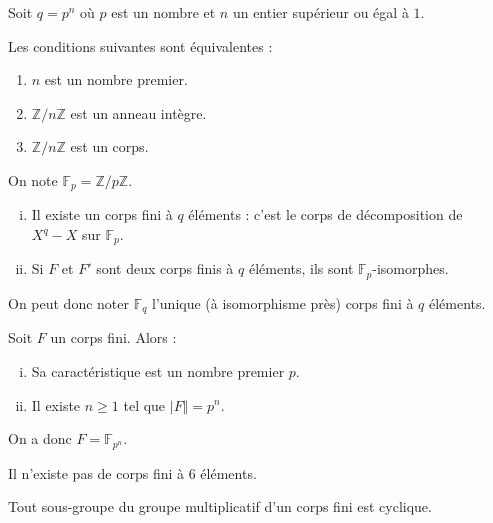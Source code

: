 	Soit $q = p^n$ où $p$ est un nombre et $n$ un entier supérieur ou égal à $1$.
	
	
	\begin{proposition}
		Les conditions suivantes sont équivalentes :
		\begin{enumerate}
			\item $n$ est un nombre premier.
			\item $\mathbb{Z}/n\mathbb{Z}$ est un anneau intègre.
			\item $\mathbb{Z}/n\mathbb{Z}$ est un corps.
		\end{enumerate}
	\end{proposition}
	
	\begin{notation}
		On note $\mathbb{F}_p = \mathbb{Z}/p\mathbb{Z}$.
	\end{notation}
	
	
	\begin{theorem}
		\begin{enumerate}[(i)]
			\item Il existe un corps fini à $q$ éléments : c'est le corps de décomposition de $X^q - X$ sur $\mathbb{F}_p$.
			\item Si $F$ et $F'$ sont deux corps finis à $q$ éléments, ils sont $\mathbb{F}_p$-isomorphes.
		\end{enumerate}
		On peut donc noter $\mathbb{F}_q$ l'unique (à isomorphisme près) corps fini à $q$ éléments.
	\end{theorem}
	
	
	\begin{theorem}
		Soit $F$ un corps fini. Alors :
		\begin{enumerate}[(i)]
			\item Sa caractéristique est un nombre premier $p$.
			\item Il existe $n \geq 1$ tel que $\vert F \Vert = p^n$.
		\end{enumerate}
		On a donc $F = \mathbb{F}_{p^n}$.
	\end{theorem}
	
	\begin{example}
		Il n'existe pas de corps fini à $6$ éléments.
	\end{example}
	
	\begin{theorem}
		Tout sous-groupe du groupe multiplicatif d'un corps fini est cyclique.
	\end{theorem}
	
